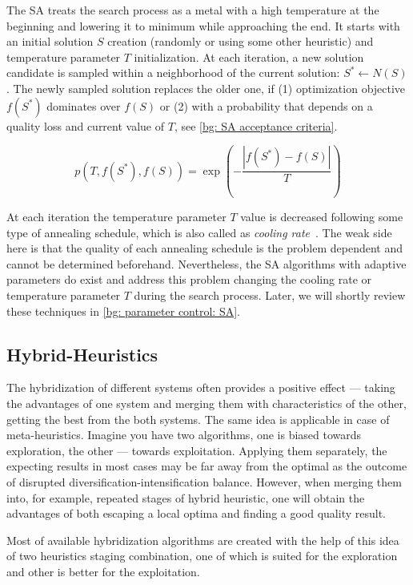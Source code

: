 The SA treats the search process as a metal with a high temperature at the beginning and lowering it to minimum while approaching the end. %
It starts with an initial solution $S$ creation (randomly or using some other heuristic) and temperature parameter $T$ initialization. At each iteration, a new solution candidate is sampled within a neighborhood of the current solution: $S^* \leftarrow N(S)$. The newly sampled solution replaces the older one, if (1) optimization objective $f(S^*)$ dominates over $f(S)$ or (2) with a probability that depends on a quality loss and current value of $T$, see \cref{bg: SA acceptance criteria}.

\begin{equation}
p(T, f(S^*), f(S)) = \exp(-\frac{|f(S^*) - f(S)|}{T})
\label{bg: SA acceptance criteria}
\end{equation}

At each iteration the temperature parameter $T$ value is decreased following some type of annealing schedule, which is also called as \textit{cooling rate}~\cite{boussaid2013survey}. The weak side here is that the quality of each annealing schedule is the problem dependent and cannot be determined beforehand. Nevertheless, the SA algorithms with adaptive parameters do exist and address this problem changing the cooling rate or temperature parameter $T$ during the search process. Later, we will shortly review these techniques in \cref{bg: parameter control: SA}.


\subsection{Hybrid-Heuristics}
The hybridization of different systems often provides a positive effect — taking the advantages of one system and merging them with characteristics of the other, getting the best from the both systems. The same idea is applicable in case of meta-heuristics. Imagine you have two algorithms, one is biased towards exploration, the other — towards exploitation. Applying them separately, the expecting results in most cases may be far away from the optimal as the outcome of disrupted diversification-intensification balance. However, when merging them into, for example, repeated stages of hybrid heuristic, one will obtain the advantages of both escaping a local optima and finding a good quality result. 

Most of available hybridization algorithms are created with the help of this idea of two heuristics staging combination, one of which is suited for the exploration and other is better for the exploitation.


